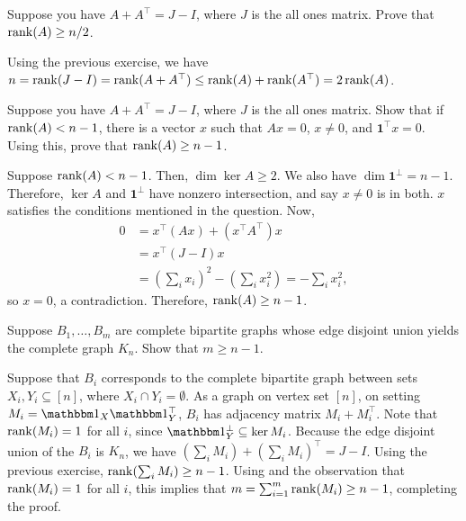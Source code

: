 \documentclass{article}
\begin{document}
\begin{exercise}
	Suppose you have $A+A^\top = J-I$, where $J$ is the all ones matrix. Prove that $\operatorname{rank}(A) \ge n/2$.
\end{exercise}
\begin{solution*}
	Using the previous exercise, we have $n = \operatorname{rank}(J-I) = \operatorname{rank}(A+A^\top) \le \operatorname{rank}(A) + \operatorname{rank}(A^\top) = 2\operatorname{rank}(A)$.
\end{solution*}

\begin{exercise}
	\label{ex1.5}
	Suppose you have $A+A^\top = J-I$, where $J$ is the all ones matrix. Show that if $\operatorname{rank}(A) < n-1$, there is a vector $x$ such that $Ax = 0$, $x \ne 0$, and $\mathbf{1}^\top x = 0$. Using this, prove that $\operatorname{rank}(A) \ge n-1$.
\end{exercise}
\begin{solution*}
	Suppose $\operatorname{rank}(A) < n-1$. Then, $\dim \ker A \ge 2$. We also have $\dim \mathbf{1}^\perp = n-1$. Therefore, $\ker A$ and $\mathbf{1}^\perp$ have nonzero intersection, and say $x \ne 0$ is in both. $x$ satisfies the conditions mentioned in the question. Now,
	\begin{align*}
		0 &= x^\top (Ax) + (x^\top A^\top) x \\
			&= x^\top (J-I) x \\
			&= \left(\sum_i x_i\right)^2 - \left(\sum_i x_i^2\right) = - \sum_i x_i^2,
	\end{align*}
	so $x = 0$, a contradiction. Therefore, $\operatorname{rank}(A) \ge n-1$.
\end{solution*}

\begin{exercise}
	Suppose $B_1,\ldots,B_m$ are complete bipartite graphs whose edge disjoint union yields the complete graph $K_n$. Show that $m \ge n-1$.
\end{exercise}
\begin{solution*}
	Suppose that $B_i$ corresponds to the complete bipartite graph between sets $X_i,Y_i \subseteq [n]$, where $X_i \cap Y_i = \emptyset$. As a graph on vertex set $[n]$, on setting $M_i = \indic_X \indic_Y^\top$, $B_i$ has adjacency matrix $M_i + M_i^\top$. Note that $\operatorname{rank}(M_i) = 1$ for all $i$, since $\indic_Y^\perp \subseteq \ker M_i$. Because the edge disjoint union of the $B_i$ is $K_n$, we have $(\sum_i M_i) + (\sum_i M_i)^\top = J-I$. Using the previous exercise, $\operatorname{rank}(\sum_i M_i) \ge n-1$. Using  and the observation that $\operatorname{rank}(M_i) = 1$ for all $i$, this implies that $m = \sum_{i=1}^m \operatorname{rank}(M_i) \ge n-1$, completing the proof.
\end{solution*}
\end{document}
